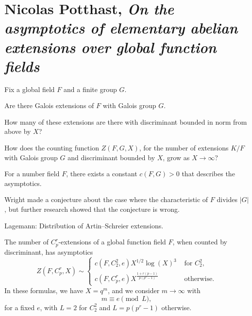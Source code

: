 \documentclass[reqno]{amsart} 
\begin{document}
\section{Nicolas Potthast, \emph{On the asymptotics of elementary abelian extensions over global function fields}}
Fix a global field $F$ and a finite group $G$.
\begin{question}
Are there Galois extensions of $F$ with Galois group $G$.
\end{question}
\begin{question}
How many of these extensions are there with discriminant bounded in norm from above by $X$?
\end{question}
\begin{question}
  How does the counting function $Z (F, G, X)$, for the number of extensions  $K/F$ with Galois group $G$ and discriminant bounded by $X$, grow as $X \rightarrow \infty$?
\end{question}
\begin{conjecture}[Malle 2005]
  For a number field $F$, there exists a constant $c (F, G) > 0$ that describes the asymptotics.
\end{conjecture}
Wright made a conjecture about the case where the characteristic of $F$ divides $\lvert G \rvert$, but further research showed that the conjecture is wrong.

Lagemann: Distribution of Artin--Schreier extensions.

\begin{theorem}
  The number of $C_p^r$-extensions of a global function field $F$, when counted by discriminant, has asymptotics
  \begin{equation*}
Z (F, C_p^r , X) \sim
\begin{cases}
c (F, C_2^2, e) X^{1/2} \log (X)^3  & \text{ for } C_2^2 , \\
c (F, C_p^r , e) X^{\frac{1 + r (p - 1 )}{p (p^r - 1 )}} & \text{ otherwise.}
\end{cases}
\end{equation*}
In these formulas, we have $X = q^m $, and we consider $m \rightarrow \infty $ with
\begin{equation*}
  m \equiv e \pmod{L},
\end{equation*}
for a fixed $e$, with $L = 2$ for $C_2^2 $ and $L = p (p^r-1)$ otherwise.
\end{theorem}
\end{document}
